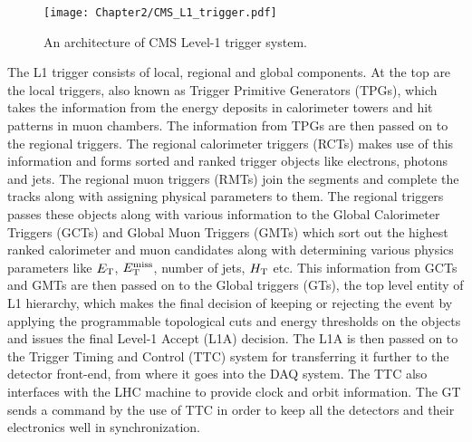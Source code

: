 \begin{figure}[h]
\begin{center}
\texttt{[image: Chapter2/CMS\_L1\_trigger.pdf]}
\caption{An architecture of CMS Level-1 trigger system.}
\label{fig:CMS_L1}
\end{center}
\end{figure}
The L1 trigger consists of local, regional and global components. At the top are the local triggers, also known as Trigger Primitive Generators (TPGs),
which takes the information from the energy deposits in calorimeter towers and hit patterns in muon chambers. The information from TPGs are then passed on
to the regional triggers. The regional calorimeter triggers (RCTs) makes use of this information and forms sorted and ranked trigger
objects like electrons, photons and jets. The regional muon triggers (RMTs) join the segments and complete the tracks along with assigning physical parameters to them.
The regional triggers passes these objects along with various information to the Global Calorimeter Triggers (GCTs) and Global Muon Triggers (GMTs)
which sort out the highest ranked calorimeter and muon candidates along with determining various physics parameters like $E_{\mathrm T}$, $E_{\mathrm{T}}^{\text{miss}}$, number of jets, $H_{\mathrm{T}}$ etc.
This information from GCTs and GMTs are then passed on to the Global triggers (GTs),
the top level entity of L1 hierarchy, which makes the final decision of keeping or rejecting the event
by applying the programmable topological cuts and energy thresholds on the objects and issues the final Level-1 Accept (L1A) decision. The L1A is then
passed on to the Trigger Timing and Control (TTC) system for transferring it further to the detector front-end, from where it goes into the DAQ system.
The TTC also interfaces with the LHC machine to
provide clock and orbit information. The GT sends a command by the use of TTC in order to keep all the detectors and their electronics well in synchronization.

